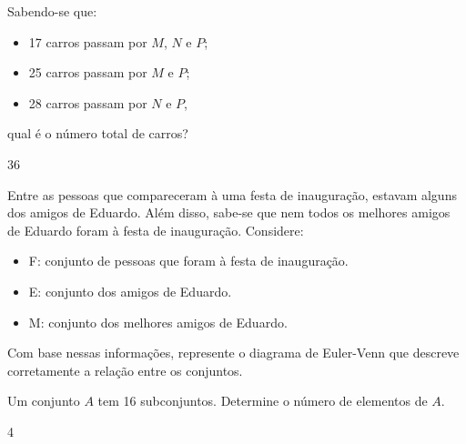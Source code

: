 \begin{secExercicios}
\begin{exer}
\begin{center}
\end{center}

\noindent Sabendo-se que:
\begin{itemize}
    \item 17 carros passam por $M$, $N$ e $P$;
    \item 25 carros passam por $M$ e $P$;
    \item 28 carros passam por $N$ e $P$,
\end{itemize}
qual é o número total de carros?
\end{exer}
\begin{resp}
    36
\end{resp}

\begin{exer}
    Entre as pessoas que compareceram à uma festa de inauguração, estavam alguns dos amigos de Eduardo. Além disso, sabe-se que nem todos os melhores amigos de Eduardo foram à festa de inauguração. Considere:
\begin{itemize}
    \item F: conjunto de pessoas que foram à festa de inauguração.
    \item E: conjunto dos amigos de Eduardo.
    \item M: conjunto dos melhores amigos de Eduardo.
\end{itemize}
Com base nessas informações, represente o diagrama de Euler-Venn que descreve corretamente a relação entre os conjuntos.
\end{exer}

\begin{exer}
    Um conjunto $A$ tem 16 subconjuntos. Determine o número de elementos de $A$.
\end{exer}
\begin{resp}
    4
\end{resp}


\end{secExercicios}
